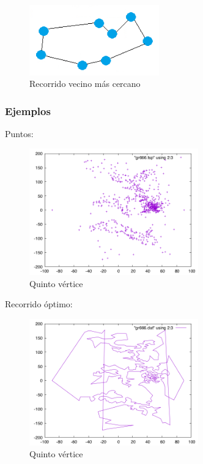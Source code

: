 \begin{figure}[htbH] 
	\centering
	\includegraphics[width=0.5\textwidth]{./Imagenes/arista9.png}
	\caption{Recorrido vecino más cercano} 
\end{figure}

\newpage
\subsubsection{Ejemplos}
Puntos:

	\begin{figure}[htbH]
		\centering
		\includegraphics[width=0.65\textwidth]{../Viajante/Imagenes/gr666.png}
		\caption{Quinto vértice}
	\end{figure}
	
Recorrido óptimo:

	\begin{figure}[htbH]
		\centering
		\includegraphics[width=0.65\textwidth]{../Viajante/Imagenes/gr666_opt.png}
		\caption{Quinto vértice}
	\end{figure}
\newpage
